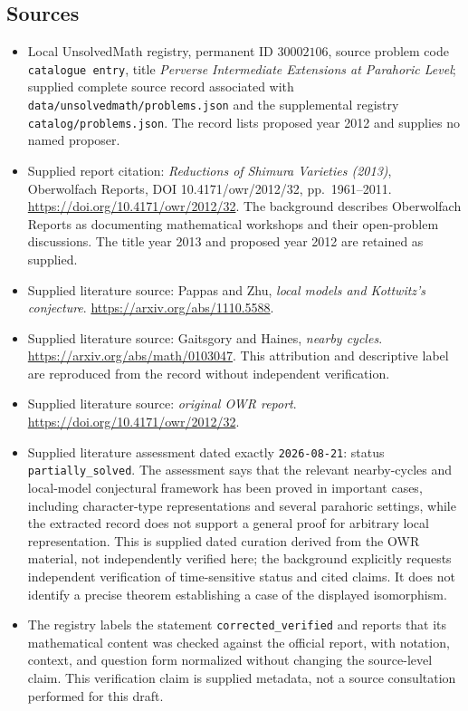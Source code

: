 \documentclass[11pt]{article}
\begin{document}
\subsection{Sources}
\begin{itemize}
\item Local UnsolvedMath registry, permanent ID \(30002106\), source problem code \texttt{catalogue entry}, title \emph{Perverse Intermediate Extensions at Parahoric Level}; supplied complete source record associated with \texttt{data/unsolvedmath/problems.json} and the supplemental registry \texttt{catalog/problems.json}. The record lists proposed year 2012 and supplies no named proposer.
\item Supplied report citation: \emph{Reductions of Shimura Varieties (2013)}, Oberwolfach Reports, DOI 10.4171/owr/2012/32, pp.\ 1961--2011. \url{https://doi.org/10.4171/owr/2012/32}. The background describes Oberwolfach Reports as documenting mathematical workshops and their open-problem discussions. The title year 2013 and proposed year 2012 are retained as supplied.
\item Supplied literature source: Pappas and Zhu, \emph{local models and Kottwitz's conjecture}. \url{https://arxiv.org/abs/1110.5588}.
\item Supplied literature source: Gaitsgory and Haines, \emph{nearby cycles}. \url{https://arxiv.org/abs/math/0103047}. This attribution and descriptive label are reproduced from the record without independent verification.
\item Supplied literature source: \emph{original OWR report}. \url{https://doi.org/10.4171/owr/2012/32}.
\item Supplied literature assessment dated exactly \texttt{2026-08-21}: status \texttt{partially\_solved}. The assessment says that the relevant nearby-cycles and local-model conjectural framework has been proved in important cases, including character-type representations and several parahoric settings, while the extracted record does not support a general proof for arbitrary local representation. This is supplied dated curation derived from the OWR material, not independently verified here; the background explicitly requests independent verification of time-sensitive status and cited claims. It does not identify a precise theorem establishing a case of the displayed isomorphism.
\item The registry labels the statement \texttt{corrected\_verified} and reports that its mathematical content was checked against the official report, with notation, context, and question form normalized without changing the source-level claim. This verification claim is supplied metadata, not a source consultation performed for this draft.
\end{itemize}
\end{document}
